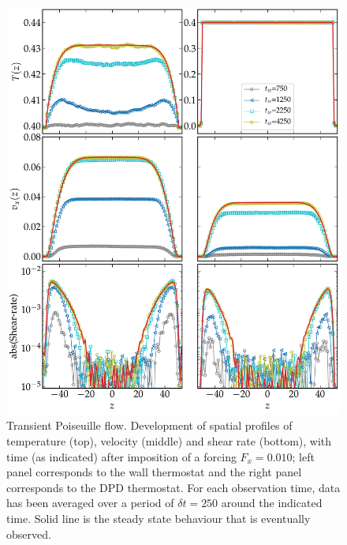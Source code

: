 \begin{figure}
\centering
\includegraphics[width=15cm]{figs/profDev.pdf}
\caption[{\em Transient Poiseuille flow: development of spatial profiles of temperature, velocity and shear-rate, for the wall thermostat and DPD thermostat}]{Transient Poiseuille flow. Development of spatial profiles of temperature (top), velocity (middle) and shear rate (bottom), with time (as indicated) after imposition of a forcing $F_x = 0.010$; left panel corresponds to the wall thermostat and the right panel corresponds to the DPD thermostat. For each observation time, data has been averaged over a period of $\delta t = 250$ around the indicated time. Solid line is the steady state behaviour that is eventually observed.
}
\label{onset2}
\end{figure}


